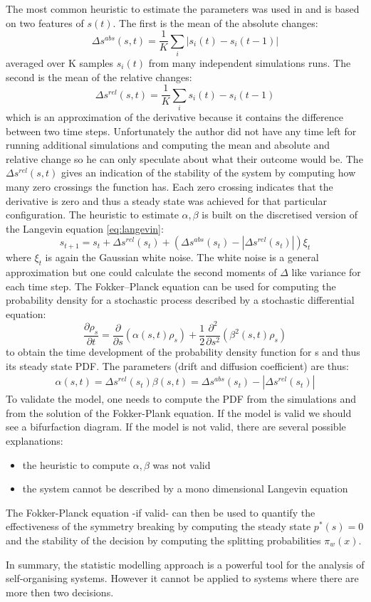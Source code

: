 The most common heuristic to estimate the parameters was
used in \citet{Hamann2010:AnalysisSimmetry} and is based on two features of $s(t)$.
The first is the mean of the absolute changes:
\begin{equation}
\varDelta s^{abs}(s,t)=\frac{1}{K}\sum_i | s_i(t)-s_i(t-1)|
\end{equation}
averaged over K samples $s_i(t)$ from many independent
simulations runs.
The second is the mean of the relative changes:
\begin{equation}
\varDelta s^{rel}(s,t)=\frac{1}{K}\sum_i  s_i(t)-s_i(t-1)
\end{equation}
which is an approximation of the derivative because
it contains the difference between two time steps.
Unfortunately the author did not have any time left for running
additional simulations and computing the mean and absolute
and relative change so he can only speculate about what their outcome would be.
The $\varDelta s^{rel}(s,t)$ gives an indication of the
stability of the system by computing how many zero crossings
the function has.
Each zero crossing indicates that the derivative is zero
and thus a steady state was achieved for that particular
configuration.
The heuristic to estimate $\alpha,\beta$ is built on the discretised
version of the Langevin equation \ref{eq:langevin}:
\begin{equation}
s_{t+1}=s_{t}+ \varDelta s^{rel}(s_t)+( \varDelta s^{abs}(s_t)-|\varDelta s^{rel}(s_t)|)\xi_t
\end{equation}
where $\xi_t$ is again the Gaussian white noise.
The white noise is a general approximation but one could calculate the second
moments of $\varDelta$ like variance for each time step.
The Fokker–Planck equation can be used for computing the probability density
for a stochastic process described by a stochastic differential equation:
\begin{equation}
\frac{\partial \rho_s}{\partial t}=\frac{\partial}{\partial s}(\alpha(s,t)\rho_s)+\frac{1}{2} \frac{\partial^2}{\partial s^2}(\beta^2(s,t)\rho_s)
\end{equation}
to obtain the time development of the probability density function for s and
thus its steady state PDF.
The parameters (drift and diffusion coefficient) are thus:
\begin{align*}
\alpha(s,t)= \varDelta s^{rel}(s_t)
\beta(s,t)=\varDelta s^{abs}(s_t)-|\varDelta s^{rel}(s_t)|
\end{align*}
To validate the model, one needs to compute the PDF from the simulations
and from the solution of the Fokker-Plank equation.
If the model is valid we should see a bifurfaction diagram.
If the model is not valid, there are several possible explanations:
\begin{itemize}
 \item the heuristic to compute $\alpha,\beta$ was not valid
 \item the system cannot be described by a mono dimensional Langevin equation
\end{itemize}
The Fokker-Planck equation -if valid- can then be used to quantify
the effectiveness of the symmetry breaking by computing the steady state $p^*(s)=0$
and the stability of the decision by computing the splitting probabilities $\pi_w(x)$.

In summary, the statistic modelling approach is a powerful tool for the analysis
of self-organising systems.
However it cannot be applied to systems where there are more then
two decisions. 